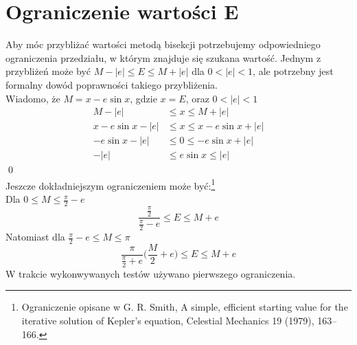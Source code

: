 \documentclass[11pt,wide]{mwart}
\begin{document}
\section{Ograniczenie wartości E}
Aby móc przybliżać wartości metodą bisekcji potrzebujemy odpowiedniego ograniczenia przedziału, w którym znajduje się szukana wartość. Jednym z przybliżeń może być $M - |e| \leq E \leq M + |e|$ dla $0 <|e| < 1$, ale potrzebny jest formalny dowód poprawności takiego przybliżenia. \\
Wiadomo, że $M = x - e \sin x$, gdzie $x = E$, oraz $0 < |e| < 1$
\begin{align*}
M - |e| &\leq x \leq M + |e|\\
x - e \sin x - |e| &\leq x \leq x - e \sin x + |e| \\
-e \sin x -|e| &\leq 0 \leq -e \sin x + |e|\\
-|e| &\leq e \sin x \leq |e|
\end{align*}
\qed \\

Jeszcze dokładniejszym ograniczeniem może być:\footnote{Ograniczenie opisane w G. R. Smith, A simple, efficient starting value for the iterative solution of Kepler’s equation, Celestial Mechanics 19 (1979), 163–166.} \\
Dla $0 \leq M \leq \frac{\pi}{2} - e$
\begin{equation*}
\frac{\frac{\pi}{2}}{\frac{\pi}{2} - e} \leq E \leq M + e
\end{equation*}
Natomiast dla $\frac{\pi}{2} - e \leq M \leq \pi$
\begin{equation*}
\frac{\pi}{\frac{\pi}{2} + e} \Big( \frac{M}{2} + e \Big) \leq E \leq M + e
\end{equation*}
W trakcie wykonwywanych testów używano pierwszego ograniczenia.
\end{document}
